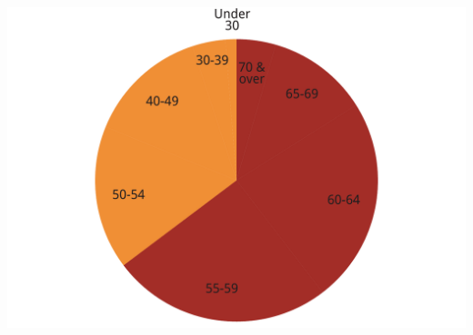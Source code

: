 \documentclass[tikz]{standalone}\usepackage[]{graphicx}\usepackage[]{color}
\newenvironment{knitrout}{}{} %
\begin{document}
\begin{knitrout}
\color{fgcolor}
\includegraphics[width=11.000in,height=7.7in]{./Super-tax-targeting/b5-super-atlas/Figure4-7-1} 

\end{knitrout}
\end{document}
